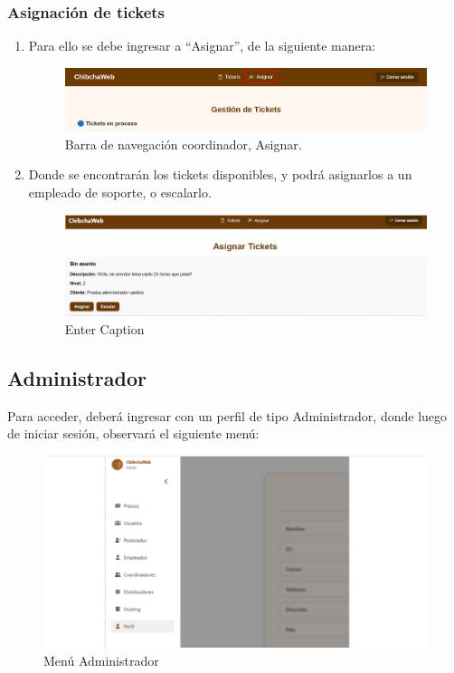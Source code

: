 \subsubsection{Asignación de tickets }
\begin{enumerate}
    \item Para ello se debe ingresar a “Asignar”, de la siguiente manera:
        \begin{figure}[H]
        \centering
        \includegraphics[width=0.8\linewidth]{guiamodulo/navbar-coo-asignar.png}
        \caption{Barra de navegación coordinador, Asignar.}
        \label{fig:navbar-coo-asignar}
        \end{figure}
    \item Donde se encontrarán los tickets disponibles, y podrá asignarlos a un empleado de soporte, o escalarlo.
        \begin{figure}[H]
            \centering
            \includegraphics[width=0.8\linewidth]{guiamodulo/coordinador-asignar.png}
            \caption{Enter Caption}
            \label{fig:placeholder}
        \end{figure}
\end{enumerate}


\subsection{Administrador}
Para acceder, deberá ingresar con un perfil de tipo Administrador, donde luego de iniciar sesión, observará el siguiente menú:
\begin{figure}[H]
    \centering
    \includegraphics[width=1\linewidth]{guiamodulo/menu-admin.png}
    \caption{Menú Administrador}
    \label{fig:menu-admin}
\end{figure}

